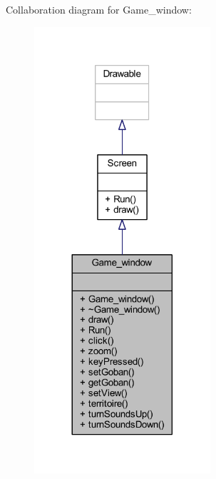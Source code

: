 Collaboration diagram for Game\+\_\+window\+:
\nopagebreak
\begin{figure}[H]
\begin{center}
\leavevmode
\includegraphics[width=185pt]{class_game__window__coll__graph}
\end{center}
\end{figure}
